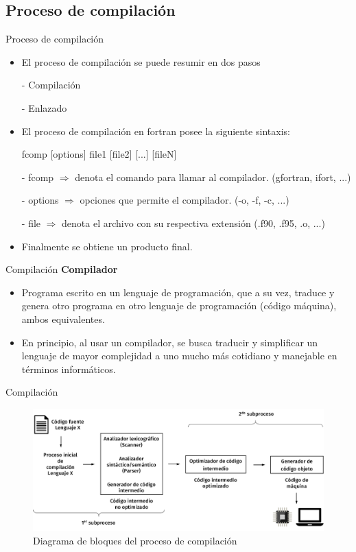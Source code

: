 
\subsection{Proceso de compilación}

\begin{frame}[fragile]{Proceso de compilación}
  \begin{itemize}[<+(1)->]
  \item  El proceso de compilación se puede resumir en dos pasos
  \hspace{1cm} \item [-] Compilación
  \hspace{1cm} \item [-] Enlazado

  \item El proceso de compilación en fortran posee la siguiente sintaxis:
   \begin{mintedbash} 
    fcomp [options] file1 [file2] [...] [fileN]
   \end{mintedbash}
  \item [-] fcomp $\Rightarrow$ denota el comando para llamar al compilador. (gfortran, ifort, ...)
  \item [-] options $\Rightarrow$ opciones que permite el compilador. (-o, -f, -c, ...)
  \item [-] file $\Rightarrow$ denota el archivo con su respectiva extensión (.f90, .f95, .o, ...)    
  \item Finalmente se obtiene un producto final.
\end{itemize}
\end{frame}
  

\begin{frame}[fragile]{Compilación}
\textbf{Compilador}
  \begin{itemize}[<+(1)->]
  \item Programa  escrito en un lenguaje de programación, que a su vez, traduce y genera otro programa
en otro lenguaje de programación (código máquina), ambos equivalentes.
  \item En principio, al usar un compilador, se busca traducir y simplificar un lenguaje de mayor complejidad a uno mucho más cotidiano y manejable en términos informáticos.
 \end{itemize}
\end{frame}


\begin{frame}[fragile]{Compilación}

  \begin{figure}
    \includegraphics[width=1\textwidth]{./resources/compilation_op.png}
    \caption{Diagrama de bloques del proceso de compilación}
   \end{figure}
\end{frame}
